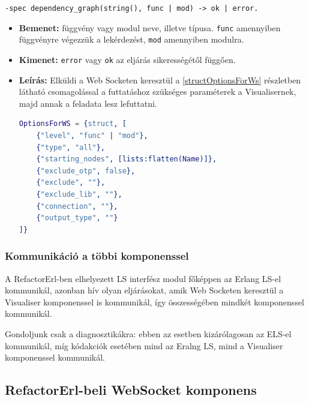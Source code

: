     
    \noindent \lstinline{-spec dependency_graph(string(), func | mod) -> ok | error.}
    \begin{itemize}
        \item \textbf{Bemenet:} függvény vagy modul neve, illetve típusa. \lstinline{func} amennyiben függvényre végezzük a lekérdezést, \lstinline{mod} amennyiben modulra.
        \item \textbf{Kimenet:} \lstinline{error} vagy \lstinline{ok} az eljárás sikerességétől függően.
        \item \textbf{Leírás:} Elküldi a Web Socketen keresztül a \ref{structOptionsForWs} részletben látható csomagolással a futtatáshoz szükséges paraméterek a Visualisernek, majd annak a feladata lesz lefuttatni. \\ \newpage
\lstset{caption=Web Socketen keresztül küldött opciók, label=structOptionsForWs}  
\begin{lstlisting}[language={erlang}] 
OptionsForWS = {struct, [
    {"level", "func" | "mod"},
    {"type", "all"},
    {"starting_nodes", [lists:flatten(Name)]},
    {"exclude_otp", false},
    {"exclude", ""},
    {"exclude_lib", ""},
    {"connection", ""},
    {"output_type", ""}
]}
\end{lstlisting}
    \end{itemize}
    
   





\subsubsection{Kommunikáció a többi komponenssel}

A RefactorErl-ben elhelyezett LS interfész modul főképpen az Erlang LS-el kommunikál, azonban hív olyan eljárásokat, amik Web Socketen keresztül a Visualiser komponenssel is kommunikál, így összességében mindkét komponenssel kommunikál.

Gondoljunk csak a diagnosztikákra: ebben az esetben kizárólagosan az ELS-el kommunikál, míg kódakciók esetében mind az Eralng LS, mind a Visualiser komponenssel kommunikál.



\subsection{RefactorErl-beli WebSocket komponens}

